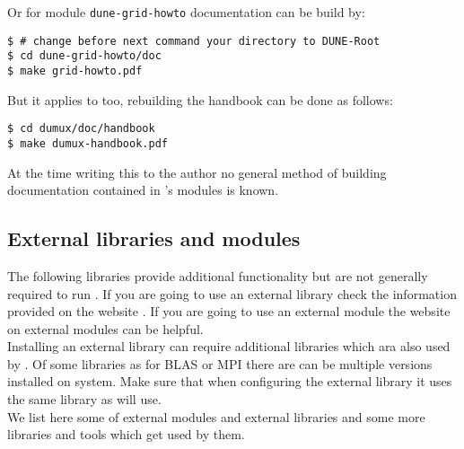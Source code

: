 Or for module \texttt{dune-grid-howto} documentation can be build by: 

\begin{lstlisting}[style=Bash]
$ # change before next command your directory to DUNE-Root
$ cd dune-grid-howto/doc
$ make grid-howto.pdf
\end{lstlisting}

But it applies to \Dumux too, rebuilding the handbook can be done as follows:

\begin{lstlisting}[style=Bash]
$ cd dumux/doc/handbook
$ make dumux-handbook.pdf
\end{lstlisting}


At the time writing this to the author no general method of building documentation contained in \Dune's modules is known.


\subsection{External libraries and modules} \label{sec:external-modules-libraries}

The following libraries provide additional functionality but are not generally required to run \Dumux. 
If you are going to use an external library check the information provided on the \Dune website \cite{DUNE-EXT-LIB}.
If you are going to use an external \Dune module the website on external modules \cite{DUNE-EXT-MOD} can be helpful.\\


Installing an external library can require additional libraries which ara also used by \Dune. 
Of some libraries as for BLAS or MPI there are can be multiple versions installed on system.
Make sure that when configuring the external library it uses the same library as \Dune will use.\\

We list here some of external modules and external libraries and some more libraries and tools which get used by them.

